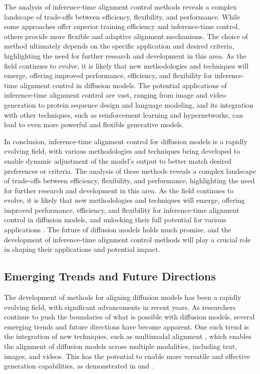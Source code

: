 \documentclass[11pt,a4paper]{article}
\begin{document}
The analysis of inference-time alignment control methods reveals a complex landscape of trade-offs between efficiency, flexibility, and performance. While some approaches offer superior training efficiency and inference-time control, others provide more flexible and adaptive alignment mechanisms. The choice of method ultimately depends on the specific application and desired criteria, highlighting the need for further research and development in this area. As the field continues to evolve, it is likely that new methodologies and techniques will emerge, offering improved performance, efficiency, and flexibility for inference-time alignment control in diffusion models. The potential applications of inference-time alignment control are vast, ranging from image and video generation to protein sequence design and language modeling, and its integration with other techniques, such as reinforcement learning and hypernetworks, can lead to even more powerful and flexible generative models.

In conclusion, inference-time alignment control for diffusion models is a rapidly evolving field, with various methodologies and techniques being developed to enable dynamic adjustment of the model's output to better match desired preferences or criteria. The analysis of these methods reveals a complex landscape of trade-offs between efficiency, flexibility, and performance, highlighting the need for further research and development in this area. As the field continues to evolve, it is likely that new methodologies and techniques will emerge, offering improved performance, efficiency, and flexibility for inference-time alignment control in diffusion models, and unlocking their full potential for various applications \cite{arxiv:2503.08295,arxiv:2303.07576,arxiv:2302.10907}. The future of diffusion models holds much promise, and the development of inference-time alignment control methods will play a crucial role in shaping their applications and potential impact.


\subsection{Emerging Trends and Future Directions}


The development of methods for aligning diffusion models has been a rapidly evolving field, with significant advancements in recent years. As researchers continue to push the boundaries of what is possible with diffusion models, several emerging trends and future directions have become apparent. One such trend is the integration of new techniques, such as multimodal alignment \cite{doi:10.18653/v1/d19-1136}, which enables the alignment of diffusion models across multiple modalities, including text, images, and videos. This has the potential to enable more versatile and effective generation capabilities, as demonstrated in \cite{arxiv:2211.06235} and \cite{doi:10.1145/3680528.3687621}.
\end{document}

